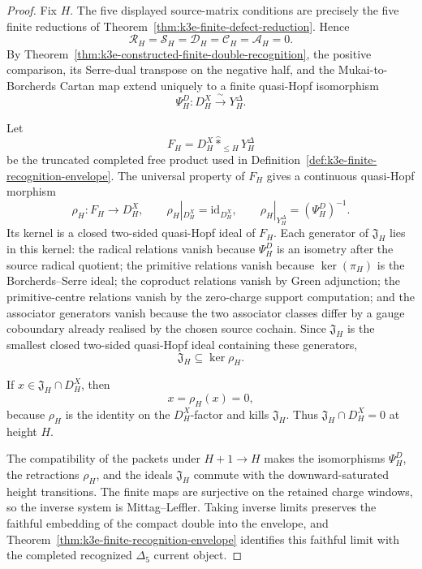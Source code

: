 \begin{proof}
Fix \(H\). The five displayed source-matrix conditions are precisely
the five finite reductions of
Theorem~\ref{thm:k3e-finite-defect-reduction}. Hence
\[
 \mathcal R_H=\mathcal S_H=\mathcal D_H=\mathcal C_H=\mathcal A_H=0 .
\]
By Theorem~\ref{thm:k3e-constructed-finite-double-recognition}, the
positive comparison, its Serre-dual transpose on the negative half,
and the Mukai-to-Borcherds Cartan map extend uniquely to a finite
quasi-Hopf isomorphism
\[
 \Psi_H^D\colon D_H^X \xrightarrow{\;\sim\;} Y_H^\Delta .
\]

Let
\[
 F_H=D_H^X\widehat{*}_{\leq H}Y_H^\Delta
\]
be the truncated completed free product used in
Definition~\ref{def:k3e-finite-recognition-envelope}. The universal
property of \(F_H\) gives a continuous quasi-Hopf morphism
\[
 \rho_H\colon F_H\longrightarrow D_H^X,
 \qquad
 \rho_H|_{D_H^X}=\mathrm{id}_{D_H^X},
 \qquad
 \rho_H|_{Y_H^\Delta}=(\Psi_H^D)^{-1}.
\]
Its kernel is a closed two-sided quasi-Hopf ideal of \(F_H\). Each
generator of \(\mathfrak J_H\) lies in this kernel: the radical
relations vanish because \(\Psi_H^D\) is an isometry after the source
radical quotient; the primitive relations vanish because
\(\ker(\pi_H)\) is the Borcherds--Serre ideal; the coproduct relations
vanish by Green adjunction; the primitive-centre relations vanish by
the zero-charge support computation; and the associator generators
vanish because the two associator classes differ by a gauge
coboundary already realised by the chosen source cochain. Since
\(\mathfrak J_H\) is the smallest closed two-sided quasi-Hopf ideal
containing these generators,
\[
 \mathfrak J_H\subseteq\ker\rho_H .
\]

If \(x\in \mathfrak J_H\cap D_H^X\), then
\[
 x=\rho_H(x)=0,
\]
because \(\rho_H\) is the identity on the \(D_H^X\)-factor and kills
\(\mathfrak J_H\). Thus \(\mathfrak J_H\cap D_H^X=0\) at height \(H\).

The compatibility of the packets under \(H+1\to H\) makes the
isomorphisms \(\Psi^D_H\), the retractions \(\rho_H\), and the ideals
\(\mathfrak J_H\) commute with the downward-saturated height
transitions. The finite maps are surjective on the retained charge
windows, so the inverse system is Mittag--Leffler. Taking inverse
limits preserves the faithful embedding of the compact double into the
envelope, and Theorem~\ref{thm:k3e-finite-recognition-envelope}
identifies this faithful limit with the completed recognized
\(\Delta_5\) current object.
\end{proof}


